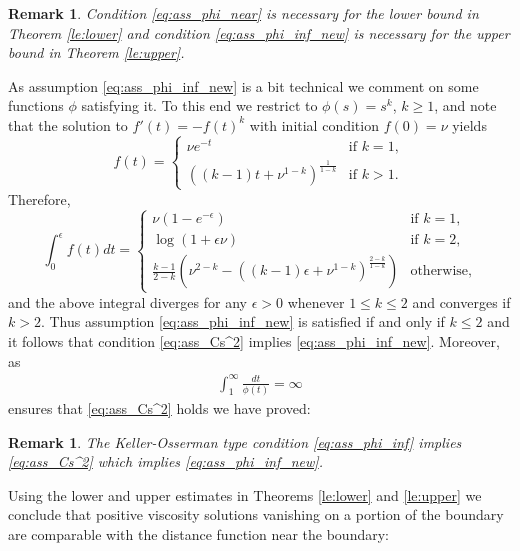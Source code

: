 \documentclass[12pt]{article}
\newtheorem{remark}[theorem]{Remark}
\numberwithin{komcounter}{section}
\begin{document}
\begin{remark}\label{re:necessity-phi-inf}
Condition \eqref{eq:ass_phi_near} is necessary for the lower bound in Theorem \ref{le:lower} and
condition \eqref{eq:ass_phi_inf_new} is necessary for the upper bound in Theorem \ref{le:upper}.
\end{remark}

As assumption \eqref{eq:ass_phi_inf_new} is a bit technical we comment on some functions $\phi$ satisfying it.
To this end we restrict to $\phi(s) = s^k$, $k \geq 1$, and note that the solution to
%
$
f'(t) = - f(t)^k
$
%
with initial condition $f(0) = \nu$ yields
%
$$
f(t) = \left\{
\begin{array}{ll}
\nu e^{-t} & \text{if $k = 1$}, \\
\left((k - 1) t + \nu^{1-k}\right)^\frac{1}{1-k} & \text{if $k > 1$}.
\end{array}
\right.
$$
%
Therefore,
%
$$
\int_0^\epsilon f(t) dt
= \left\{
\begin{array}{ll}
\nu\left(1 - e^{-\epsilon}\right)  & \text{if $k = 1$},\\
\log(1 + \epsilon \nu) & \text{if $k = 2$}, \\
\frac{k-1}{2-k} \left( \nu^{2-k} - \left((k-1) \epsilon + \nu^{1-k}\right)^\frac{2-k}{1-k}\right) & \text{otherwise},
\end{array}
\right.
$$
%
and the above integral diverges for any $\epsilon > 0$ whenever $1 \leq k \leq 2$
and converges if $k > 2$.
Thus assumption \eqref{eq:ass_phi_inf_new} is satisfied if and only if $k \leq 2$
and it follows that condition \eqref{eq:ass_Cs^2} implies \eqref{eq:ass_phi_inf_new}.
Moreover, as
%
\begin{align*}
\int_{1}^{\infty} \frac{dt}{\phi(t)} = \infty
\end{align*}
%
ensures that \eqref{eq:ass_Cs^2} holds we have proved:

\begin{remark}\label{re:assumption-phi-inf}
The Keller-Osserman type condition \eqref{eq:ass_phi_inf} implies \eqref{eq:ass_Cs^2} which implies \eqref{eq:ass_phi_inf_new}.
\end{remark}

















Using the lower and upper estimates in Theorems \ref{le:lower} and \ref{le:upper} we conclude that
positive viscosity solutions vanishing on a portion of the boundary are comparable with the distance function near the boundary:
\end{document}
